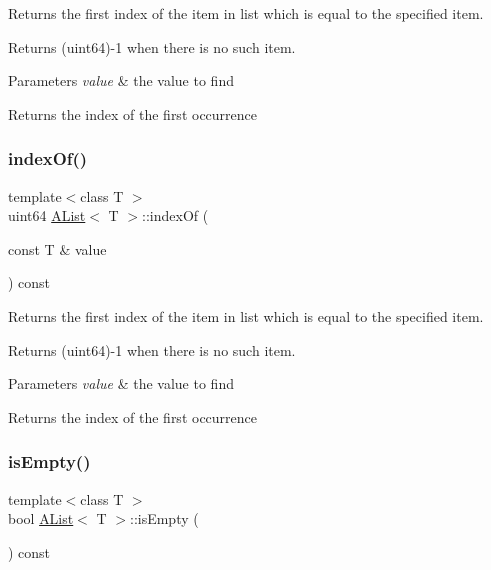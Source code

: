 Returns the first index of the item in list which is equal to the specified item. 

Returns (uint64)-\/1 when there is no such item.


\begin{DoxyParams}{Parameters}
{\em value} & the value to find \\
\hline
\end{DoxyParams}
\begin{DoxyReturn}{Returns}
the index of the first occurrence 
\end{DoxyReturn}
\mbox{\label{class_a_list_ae4fb007041bc433557e301794b761386}} 
\subsubsection{\texorpdfstring{indexOf()}{indexOf()}}
{\footnotesize\ttfamily template$<$class T $>$ \\
uint64 \mbox{\hyperlink{class_a_list}{A\+List}}$<$ T $>$\+::index\+Of (\begin{DoxyParamCaption}\item[{const T \&}]{value }\end{DoxyParamCaption}) const}



Returns the first index of the item in list which is equal to the specified item. 

Returns (uint64)-\/1 when there is no such item.


\begin{DoxyParams}{Parameters}
{\em value} & the value to find \\
\hline
\end{DoxyParams}
\begin{DoxyReturn}{Returns}
the index of the first occurrence 
\end{DoxyReturn}
\mbox{\label{class_a_list_ab0c4bd9783b1a181471e05f9fda79138}} 
\subsubsection{\texorpdfstring{isEmpty()}{isEmpty()}}
{\footnotesize\ttfamily template$<$class T $>$ \\
bool \mbox{\hyperlink{class_a_list}{A\+List}}$<$ T $>$\+::is\+Empty (\begin{DoxyParamCaption}{ }\end{DoxyParamCaption}) const}



